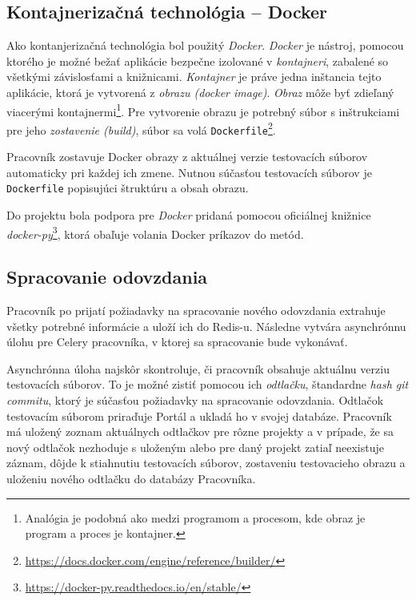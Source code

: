 \documentclass[
  digital, %
  twoside, %
  table,   %
  lof,     %
  lot,     %
]{fithesis3}
\newcommand*{\footurl}[1]{\footnote{\url{#1}}}
\begin{document}
\subsection{Kontajnerizačná technológia -- Docker}

Ako kontanjerizačná technológia bol použitý \emph{Docker}. \emph{Docker} je nástroj, pomocou ktorého je možné bežať aplikácie bezpečne izolované v \emph{kontajneri}, zabalené so všetkými závislosťami a knižnicami. \emph{Kontajner} je práve jedna inštancia tejto aplikácie, ktorá je vytvorená z \emph{obrazu (docker image)}. \emph{Obraz} môže byť zdieľaný viacerými kontajnermi\footnote{Analógia je podobná ako medzi programom a procesom, kde obraz je program a proces je kontajner.}. Pre vytvorenie obrazu je potrebný súbor s inštrukciami pre jeho \emph{zostavenie (build)}, súbor sa volá \texttt{Dockerfile}\footurl{https://docs.docker.com/engine/reference/builder/}.

Pracovník zostavuje Docker obrazy z aktuálnej verzie testovacích súborov automaticky pri každej ich zmene. Nutnou súčasťou testovacích súborov je \texttt{Dockerfile} popisujúci štruktúru a obsah obrazu.

Do projektu bola podpora pre \emph{Docker} pridaná pomocou oficiálnej knižnice \emph{docker-py}\footnote{\url{https://docker-py.readthedocs.io/en/stable/}}, ktorá obaľuje volania Docker príkazov do metód.

\subsection{Spracovanie odovzdania}

Pracovník po prijatí požiadavky na spracovanie nového odovzdania extrahuje všetky potrebné informácie a uloží ich do Redis-u. Následne vytvára asynchrónnu úlohu pre Celery pracovníka, v ktorej sa spracovanie bude vykonávať.

Asynchrónna úloha najskôr skontroluje, či pracovník obsahuje aktuálnu verziu testovacích súborov. To je možné zistiť pomocou ich \emph{odtlačku}, štandardne \emph{hash git commitu}, ktorý je súčasťou požiadavky na spracovanie odovzdania. Odtlačok testovacím súborom priraďuje Portál a ukladá ho v svojej databáze. Pracovník má uložený zoznam aktuálnych odtlačkov pre rôzne projekty a v prípade, že sa nový odtlačok nezhoduje s uloženým alebo pre daný projekt zatiaľ neexistuje záznam, dôjde k stiahnutiu testovacích súborov, zostaveniu testovacieho obrazu a uloženiu nového odtlačku do databázy Pracovníka. 
\end{document}
